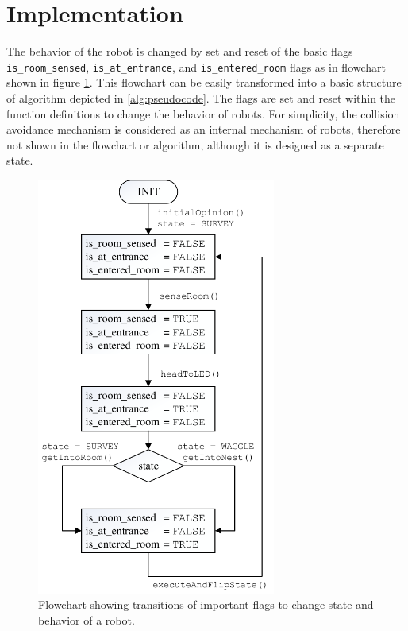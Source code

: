 \documentclass{llncs}
\begin{document}
	
	\section{Implementation}
	The behavior of the robot is changed by set and reset of the basic flags \texttt{is\_room\_sensed}, \texttt{is\_at\_entrance}, and \texttt{is\_entered\_room} flags as in flowchart shown in figure \ref{fig:flowChart}. This flowchart can be easily transformed into a basic structure of algorithm depicted in \ref{alg:pseudocode}. The flags are set and reset within the function definitions to change the behavior of robots. For simplicity, the collision avoidance mechanism is considered as an internal mechanism of robots, therefore not shown in the flowchart or algorithm, although it is designed as a separate state.
	
	\begin{figure}[h!]
		\centering
		\includegraphics[width=0.7\textwidth]{IMG/FlowChart}
		\caption{Flowchart showing transitions of important flags to change state and behavior of a robot.}
		\label{fig:flowChart}
	\end{figure}
	
\end{document}
